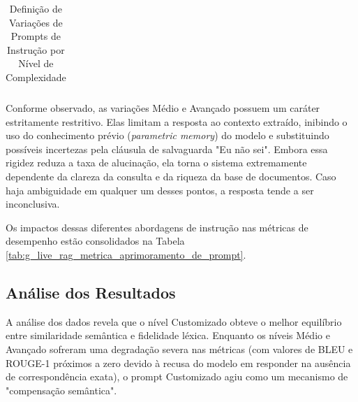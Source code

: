 \begin{table}[H]
{\begin{tabular}{l p{14cm}}
\bottomrule
\end{tabular}
}
\caption{Definição de Variações de Prompts de Instrução por Nível de Complexidade}
\label{tab:g_live_rag_prompts_instrucao}
\end{table}


Conforme observado, as variações Médio e Avançado possuem um caráter estritamente restritivo. Elas limitam a resposta ao contexto extraído, inibindo o uso do conhecimento prévio (\textit{parametric memory}) do modelo e substituindo possíveis incertezas pela cláusula de salvaguarda "Eu não sei". Embora essa rigidez reduza a taxa de alucinação, ela torna o sistema extremamente dependente da clareza da consulta e da riqueza da base de documentos. Caso haja ambiguidade em qualquer um desses pontos, a resposta tende a ser inconclusiva.

Os impactos dessas diferentes abordagens de instrução nas métricas de desempenho estão consolidados na Tabela \ref{tab:g_live_rag_metrica_aprimoramento_de_prompt}.


\begin{table}[h]
\centering

\caption{Comparação de métricas em relação ao nivel de prompt de instrução}
\label{tab:g_live_rag_metrica_aprimoramento_de_prompt}
\end{table}


\subsection{Análise dos Resultados}
A análise dos dados revela que o nível Customizado obteve o melhor equilíbrio entre similaridade semântica e fidelidade léxica. Enquanto os níveis Médio e Avançado sofreram uma degradação severa nas métricas (com valores de BLEU e ROUGE-1 próximos a zero devido à recusa do modelo em responder na ausência de correspondência exata), o prompt Customizado agiu como um mecanismo de "compensação semântica".

